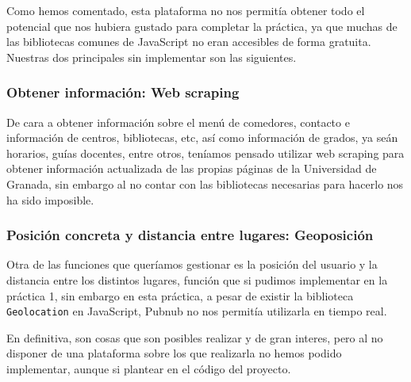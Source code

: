Como hemos comentado, esta plataforma no nos permitía obtener todo el potencial que nos hubiera gustado para completar la práctica, ya que muchas de las bibliotecas comunes de JavaScript no eran accesibles de forma gratuita. Nuestras dos principales sin implementar son las siguientes.

\subsubsection{Obtener información: Web scraping}

De cara a obtener información sobre el menú de comedores, contacto e información de centros, bibliotecas, etc, así como información de grados, ya seán horarios, guías docentes, entre otros, teníamos pensado utilizar web scraping para obtener información actualizada de las propias páginas de la Universidad de Granada, sin embargo al no contar con las bibliotecas necesarias para hacerlo nos ha sido imposible.

\subsubsection{Posición concreta y distancia entre lugares: Geoposición}

Otra de las funciones que queríamos gestionar es la posición del usuario y la distancia entre los distintos lugares, función que si pudimos implementar en la práctica 1, sin embargo en esta práctica, a pesar de existir la biblioteca \texttt{Geolocation} en JavaScript, Pubnub no nos permitía utilizarla en tiempo real.


En definitiva, son cosas que son posibles realizar y de gran interes, pero al no disponer de una plataforma sobre los que realizarla no hemos podido implementar, aunque si plantear en el código del proyecto.


